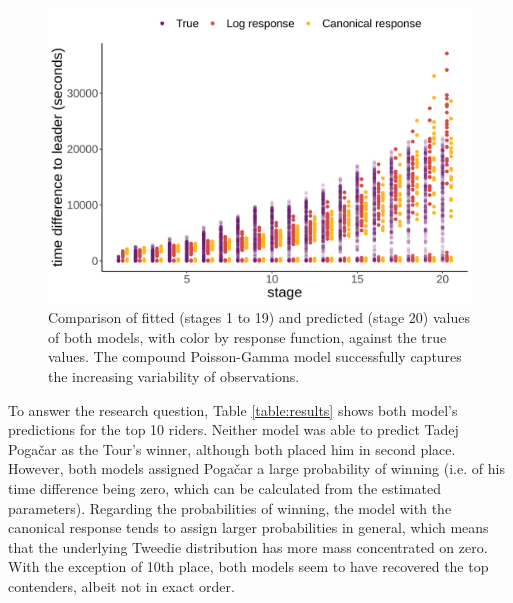\documentclass[aos,preprint]{imsart}
\begin{document}
\begin{figure}[h]
  \centering
  \includegraphics[scale=0.65]{fig/fitted_predicted_comparison.png}
  \caption{Comparison of fitted (stages 1 to 19) and predicted (stage 20) values of both models, with color by response function, against the true values. The compound Poisson-Gamma model successfully captures the increasing variability of observations.}
  \label{fig:fitted_predicted}
\end{figure}



To answer the research question, Table \ref{table:results} shows both model's predictions for the top 10 riders. Neither model was able to predict Tadej Pogačar as the Tour's winner, although both placed him in second place. However, both  models assigned Pogačar a large probability of winning (i.e. of his time difference being zero, which can be calculated from the estimated parameters). Regarding the probabilities of winning, the model with the canonical response tends to assign larger probabilities in general, which means that the underlying Tweedie distribution has more mass concentrated on zero. With the exception of 10th place, both models seem to have recovered the top contenders, albeit not in exact order. \\
\end{document}
